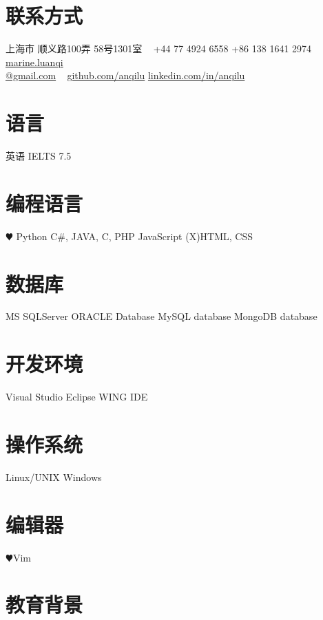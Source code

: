 \documentclass[]{friggeri-cv-cn} %
\begin{document}


\begin{aside} %
\section{联系方式}
上海市
顺义路100弄
58号1301室
~
+44 77 4924 6558
+86 138 1641 2974
~
\href{mailto:marie.luanqi@gmail.com}{marine.luanqi\\@gmail.com}
~
\href{https://github.com/anqilu}{github.com/anqilu}
\href{https://www.linkedin.com/in/anqilu}{linkedin.com/in/anqilu}
\section{语言}
英语 IELTS 7.5
\section{编程语言}
{\color{red} $\varheartsuit$} Python
C\#, JAVA, C, PHP
JavaScript
(X)HTML, CSS
\section{数据库}
MS SQLServer
ORACLE Database 
MySQL database
MongoDB database
\section{开发环境}
Visual Studio
Eclipse
WING IDE
\section{操作系统}
Linux/UNIX
Windows
\section{编辑器}
{\color{red} $\varheartsuit$}Vim
\end{aside}

\section{教育背景}
\end{document}
